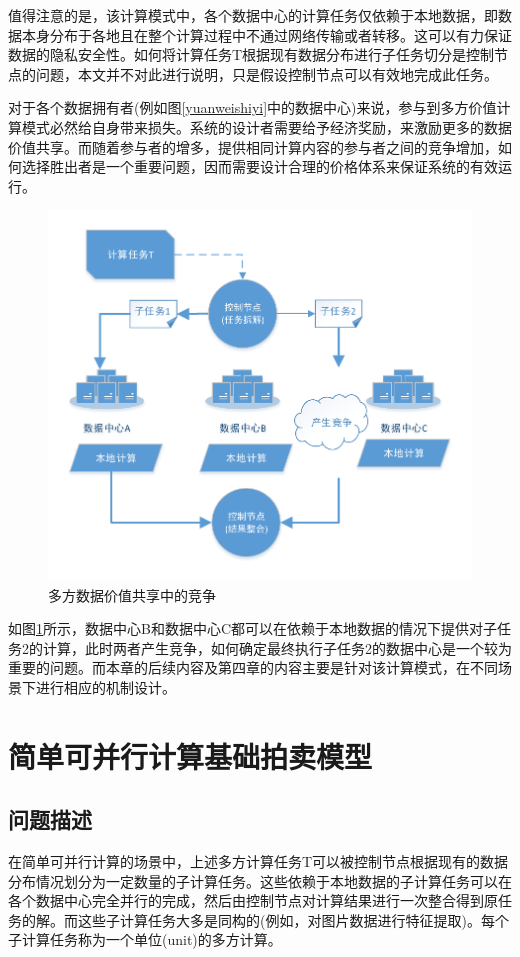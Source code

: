 \documentclass[promaster]{thesis-uestc}
\begin{document}
值得注意的是，该计算模式中，各个数据中心的计算任务仅依赖于本地数据，即数据本身分布于各地且在整个计算过程中不通过网络传输或者转移。这可以有力保证数据的隐私安全性。如何将计算任务T根据现有数据分布进行子任务切分是控制节点的问题，本文并不对此进行说明，只是假设控制节点可以有效地完成此任务。

对于各个数据拥有者(例如图\ref{yuanweishiyi}中的数据中心)来说，参与到多方价值计算模式必然给自身带来损失。系统的设计者需要给予经济奖励，来激励更多的数据价值共享。而随着参与者的增多，提供相同计算内容的参与者之间的竞争增加，如何选择胜出者是一个重要问题，因而需要设计合理的价格体系来保证系统的有效运行。
\begin{figure}[h]
\includegraphics[width=350pt]{pic/yuanweijili.pdf}
\caption{多方数据价值共享中的竞争}
\label{yuanweijili}
\end{figure}
如图\ref{yuanweijili}所示，数据中心B和数据中心C都可以在依赖于本地数据的情况下提供对子任务2的计算，此时两者产生竞争，如何确定最终执行子任务2的数据中心是一个较为重要的问题。而本章的后续内容及第四章的内容主要是针对该计算模式，在不同场景下进行相应的机制设计。

\section{简单可并行计算基础拍卖模型}

\subsection{问题描述}
在简单可并行计算的场景中，上述多方计算任务T可以被控制节点根据现有的数据分布情况划分为一定数量的子计算任务。这些依赖于本地数据的子计算任务可以在各个数据中心完全并行的完成，然后由控制节点对计算结果进行一次整合得到原任务的解。而这些子计算任务大多是同构的(例如，对图片数据进行特征提取)。每个子计算任务称为一个单位(unit)的多方计算。
\end{document}
